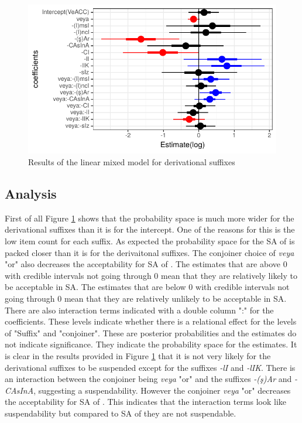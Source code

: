 \begin{knitrout}
\color{fgcolor}\begin{figure}[hbt!]

{\centering \includegraphics[]{figure/derivationalmodel-1} 

}

\caption[Results of the linear mixed model for derivational suffixes]{Results of the linear mixed model for derivational suffixes}\label{fig:derivationalmodel}
\end{figure}


\end{knitrout}

\subsection{Analysis}

First of all Figure \ref{fig:derivationalmodel} shows that the probability space is much more wider for the derivational suffixes than it is for the intercept. One of the reasons for this is the low item count for each suffix. As expected the probability space for the SA of {\Acc} is packed closer than it is for the derivaitonal suffixes. The conjoiner choice of \textit{veya} "or" also decreases the acceptability for SA of {\Acc}. The estimates that are above 0 with credible intervals not going through 0 mean that they are relatively likely to be acceptable in SA. The estimates that are below 0 with credible intervals not going through 0 mean that they are relatively unlikely to be acceptable in SA. There are also interaction terms indicated with a double column ":" for the coefficients. These levels indicate whether there is a relational effect for the levels of "Suffix" and "conjoiner". These are posterior probabilities and the estimates do not indicate significance. They indicate the probability space for the estimates. It is clear in the results provided in Figure \ref{fig:derivationalmodel} that it is not very likely for the derivational suffixes to be suspended except for the suffixes \textit{-lI} and \textit{-lIK}. There is an interaction between the conjoiner being \textit{veya} "or" and the suffixes \textit{-(ş)Ar} and \textit{-CAsInA}, suggesting a suspendability. However the conjoiner \textit{veya} "or" decreases the acceptability for SA of {\Acc}. This indicates that the interaction terms look like suspendability but compared to SA of {\Acc} they are not suspendable.


